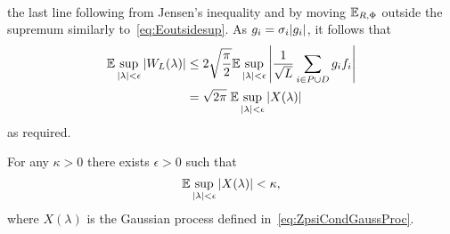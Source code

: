 \documentclass[journal]{IEEEtran}
\begin{document}
\begin{IEEEproof}
\begin{align*}
\end{align*}
the last line following from Jensen's inequality and by moving ${\mathbb E}_{R,\Phi}$ outside the supremum similarly to~\eqref{eq:Eoutsidesup}. As $g_i = \sigma_i {\left\vert g_i \right\vert}$, it follows that
\begin{align*}
{\mathbb E} \sup_{{\vert \lambda \vert} < \epsilon} {\left\vert W_L(\lambda) \right\vert}  &\leq 2\sqrt{\frac{\pi}{2}} {\mathbb E} \sup_{{\vert \lambda \vert} < \epsilon}  {\left\vert  \frac{1}{\sqrt{L}}\sum_{i\in P \cup D} g_i  f_{i} \right\vert} \\
&= \sqrt{2\pi} \; {\mathbb E} \sup_{{\vert \lambda \vert} < \epsilon}  {\left\vert  X(\lambda)  \right\vert} 
\end{align*}
as required.
\end{IEEEproof}

\begin{lemma} \label{lem:chaining}
For any $\kappa > 0$ there exists $\epsilon > 0$ such that
\[
{\mathbb E} \sup_{{\vert \lambda \vert} < \epsilon} {\left\vert  X(\lambda)  \right\vert} < \kappa,
\]
where $X(\lambda)$ is the Gaussian process defined in~\eqref{eq:ZpsiCondGaussProc}.
\end{lemma}
\end{document}
